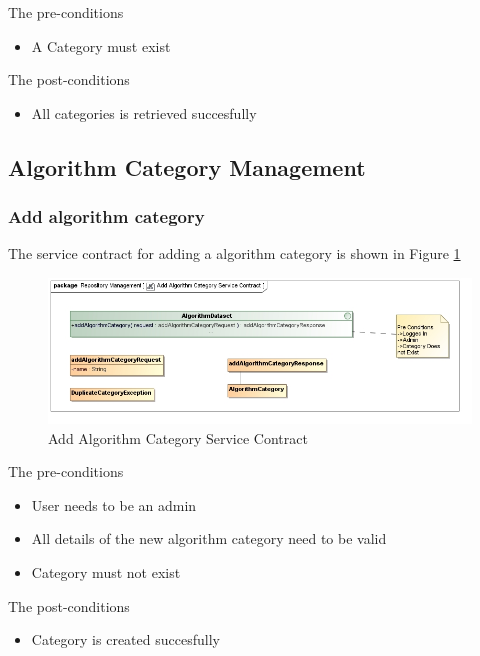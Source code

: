 The pre-conditions
\begin{itemize}
  \item A Category must exist

\end{itemize}

The post-conditions
\begin{itemize}
  \item All categories is retrieved succesfully
\end{itemize}

\subsection{Algorithm Category Management}

\subsubsection {Add algorithm category}
The service contract for adding a algorithm category is shown in Figure \ref{fig:addAlgorithmCatService}
\begin{figure}[H]
  \begin{center}
  \includegraphics[scale=0.6]{../Diagrams and Charts/Test Data/Add Algorithm Category Service Contract.jpg}
  \caption{Add Algorithm Category Service Contract}
  \label{fig:addAlgorithmCatService}
  \end{center}
  
\end{figure}

The pre-conditions
\begin{itemize}
  \item User needs to be an admin
  \item All details of the new algorithm category need to be valid
  \item Category must not exist
\end{itemize}

The post-conditions
\begin{itemize}
  \item Category is created succesfully
\end{itemize}

